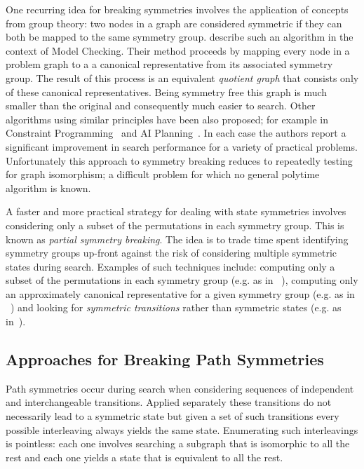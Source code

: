 One recurring idea for breaking symmetries involves the application of concepts from
group theory: two nodes in a graph are considered symmetric if they can both be mapped
to the same symmetry group. \cite{emerson96} describe such an algorithm in the context
of Model Checking. Their method proceeds by mapping every node in a problem graph to a
a canonical representative from its associated symmetry group. The result of this process
is an equivalent \emph{quotient graph} that consists only of these canonical representatives. 
Being symmetry free this graph is much smaller than the original and consequently much 
easier to search. Other algorithms using similar principles have been also proposed; for example
in Constraint Programming~\citep{crawford96,roney-dougal04} and AI Planning~\citep{pochter11}. 
In each case the authors report a significant improvement in search performance for a variety 
of practical problems.
Unfortunately this approach to symmetry breaking reduces to repeatedly testing for graph
isomorphism; a difficult problem for which no general polytime algorithm is known.

A faster and more practical strategy for dealing with state symmetries involves considering 
only a subset of the permutations in each symmetry group. This is known as 
\emph{partial symmetry breaking}. The idea is to trade time spent identifying symmetry 
groups up-front against the risk of considering multiple symmetric states during search.
Examples of such techniques include: computing only a subset of the permutations in each 
symmetry group (e.g. as in ~\citep{crawford96}), computing only an approximately canonical 
representative for a given symmetry group (e.g. as in ~\citep{pochter11}) and looking for 
\emph{symmetric transitions} rather than symmetric states 
(e.g. as in~\citep{fox99,fox02,rintannen03}).

\subsection{Approaches for Breaking Path Symmetries}
\label{cha::lit::symmetry::por}
Path symmetries occur during search when considering sequences of independent and interchangeable
transitions. Applied separately these transitions do not necessarily lead to a symmetric state but
given a set of such transitions every possible interleaving always yields the same state. 
Enumerating such interleavings is pointless: each one involves searching a subgraph that is 
isomorphic to all the rest and each one yields a state that is equivalent to all the rest.

